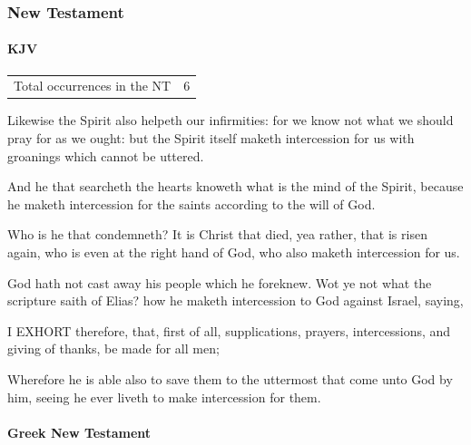 		
	\subsubsection{New Testament} %
		\label{INTERCESSION-NT}
	
		\paragraph{KJV}
			\label{INTERCESSION-NT-KJV}
	
			\begin{tabular}{ll}
				Total occurrences in the NT & 6
			\end{tabular}
			
			\begin{compactdesc}
				\item[Romans 8:26] Likewise the Spirit also helpeth our infirmities: for we know not what we should pray for as we ought: but the Spirit itself maketh intercession for us with groanings which cannot be uttered.
				\item[Romans 8:27] And he that searcheth the hearts knoweth what is the mind of the Spirit, because he maketh intercession for the saints according to the will of God.
				\item[Romans 8:34]  Who is he that condemneth?  It is Christ that died, yea rather, that is risen again, who is even at the right hand of God, who also maketh intercession for us.
				\item[Romans 11:2] God hath not cast away his people which he foreknew.  Wot ye not what the scripture saith of Elias?  how he maketh intercession to God against Israel, saying,
				\item[1 Timothy 2:1] I EXHORT therefore, that, first of all, supplications, prayers, intercessions, and giving of thanks, be made for all men;
				\item[Hebrews 7:25] Wherefore he is able also to save them to the uttermost that come unto God by him, seeing he ever liveth to make intercession for them.
			\end{compactdesc}
			
		\paragraph{Greek New Testament}
			\label{INTERCESSION-GREEK}
				
